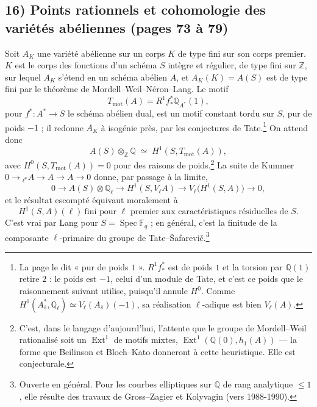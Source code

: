 \documentclass[11pt,a4paper]{article}
\begin{document}
\subsection*{16) Points rationnels et cohomologie des variétés abéliennes (pages 73 à 79)}

Soit $A_{K}$ une variété abélienne sur un corps $K$ de type fini sur son corps
premier. $K$ est le corps des fonctions d'un schéma $S$ intègre et régulier, de
type fini sur $\mathbb{Z}$, sur lequel $A_{K}$ s'étend en un schéma abélien $A$,
et $A_{K}(K) = A(S)$ est de type fini par le théorème de
Mordell--Weil--Néron--Lang. Le motif
\[
T_{\mathrm{mot}}(A) = R^{1}f^{*}_{*}\mathbb{Q}_{A^{*}}(1) ,
\]
pour $f^{*} \colon A^{*} \to S$ le schéma abélien dual, est un motif constant
tordu sur $S$, pur de poids $-1$ ; il redonne $A_{K}$ à isogénie près, par les
conjectures de Tate.\footnote{La page le dit « pur de poids $1$ ».
$R^{1}f^{*}_{*}$ est de poids $1$ et la torsion par $\mathbb{Q}(1)$ retire $2$ :
le poids est $-1$, celui d'un module de Tate, et c'est ce poids que le
raisonnement suivant utilise, puisqu'il annule $H^{0}$. Comme
$H^{1}(A^{*}_{\bar{s}}, \mathbb{Q}_{\ell}) \simeq V_{\ell}(A_{\bar{s}})(-1)$, sa
réalisation $\ell$-adique est bien $V_{\ell}(A)$.} On attend donc
\[
A(S) \otimes_{\mathbb{Z}} \mathbb{Q} \;\simeq\; H^{1}(S, T_{\mathrm{mot}}(A)) ,
\]
avec $H^{0}(S, T_{\mathrm{mot}}(A)) = 0$ pour des raisons de poids.\footnote{C'est,
dans le langage d'aujourd'hui, l'attente que le groupe de Mordell--Weil
rationalisé soit un $\operatorname{Ext}^{1}$ de motifs mixtes, $\operatorname{Ext}^{1}(
\mathbb{Q}(0), h_{1}(A))$ --- la forme que Beilinson et Bloch--Kato donneront à
cette heuristique. Elle est conjecturale.} La suite de Kummer $0 \to
{}_{\ell^{\nu}}A \to A \to A \to 0$ donne, par passage à la limite,
\[
0 \longrightarrow A(S) \otimes \mathbb{Q}_{\ell} \longrightarrow
H^{1}(S, V_{\ell}A) \longrightarrow V_{\ell}\bigl(H^{1}(S, A)\bigr) \longrightarrow 0 ,
\]
et le résultat escompté équivaut moralement à
\[
H^{1}(S, A)(\ell) \ \text{fini pour } \ell \text{ premier aux caractéristiques
résiduelles de } S .
\]
C'est vrai par Lang pour $S = \operatorname{Spec}\mathbb{F}_{q}$ ; en général,
c'est la finitude de la composante $\ell$-primaire du groupe de
Tate--Šafarevič.\footnote{Ouverte en général. Pour les courbes elliptiques sur
$\mathbb{Q}$ de rang analytique $\leqslant 1$, elle résulte des travaux de
Gross--Zagier et Kolyvagin (vers 1988-1990).}
\end{document}
